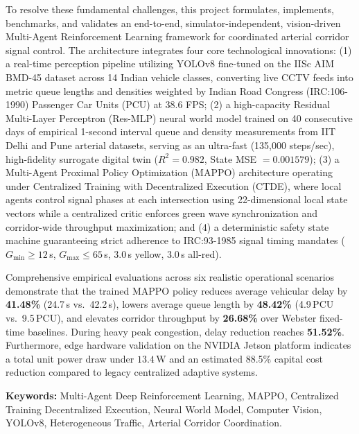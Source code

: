 \documentclass[12pt,a4paper,oneside]{report}
\begin{document}
To resolve these fundamental challenges, this project formulates, implements, benchmarks, and validates an end-to-end, simulator-independent, vision-driven Multi-Agent Reinforcement Learning framework for coordinated arterial corridor signal control. The architecture integrates four core technological innovations: (1) a real-time perception pipeline utilizing YOLOv8 fine-tuned on the IISc AIM BMD-45 dataset across 14 Indian vehicle classes, converting live CCTV feeds into metric queue lengths and densities weighted by Indian Road Congress (IRC:106-1990) Passenger Car Units (PCU) at 38.6 FPS; (2) a high-capacity Residual Multi-Layer Perceptron (Res-MLP) neural world model trained on 40 consecutive days of empirical 1-second interval queue and density measurements from IIT Delhi and Pune arterial datasets, serving as an ultra-fast (135,000 steps/sec), high-fidelity surrogate digital twin ($R^2 = 0.982$, State MSE $= 0.001579$); (3) a Multi-Agent Proximal Policy Optimization (MAPPO) architecture operating under Centralized Training with Decentralized Execution (CTDE), where local agents control signal phases at each intersection using 22-dimensional local state vectors while a centralized critic enforces green wave synchronization and corridor-wide throughput maximization; and (4) a deterministic safety state machine guaranteeing strict adherence to IRC:93-1985 signal timing mandates ($G_{\min} \ge 12$\,s, $G_{\max} \le 65$\,s, 3.0\,s yellow, 3.0\,s all-red).

Comprehensive empirical evaluations across six realistic operational scenarios demonstrate that the trained MAPPO policy reduces average vehicular delay by \textbf{41.48\%} (24.7\,s vs.\ 42.2\,s), lowers average queue length by \textbf{48.42\%} (4.9\,PCU vs.\ 9.5\,PCU), and elevates corridor throughput by \textbf{26.68\%} over Webster fixed-time baselines. During heavy peak congestion, delay reduction reaches \textbf{51.52\%}. Furthermore, edge hardware validation on the NVIDIA Jetson platform indicates a total unit power draw under $13.4$\,W and an estimated 88.5\% capital cost reduction compared to legacy centralized adaptive systems.

\vspace{1.0cm}
\noindent\textbf{Keywords:} Multi-Agent Deep Reinforcement Learning, MAPPO, Centralized Training Decentralized Execution, Neural World Model, Computer Vision, YOLOv8, Heterogeneous Traffic, Arterial Corridor Coordination.

\newpage

\tableofcontents
\newpage
\listoffigures
\newpage
\listoftables
\newpage
\end{document}
